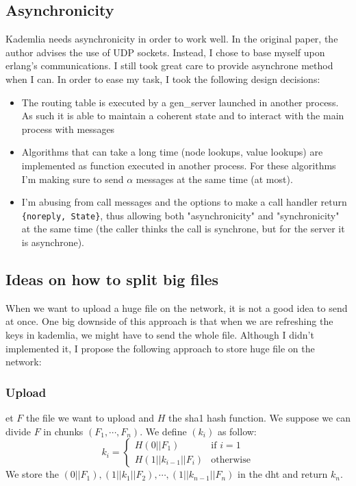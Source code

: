 \documentclass[a4paper]{article}
\begin{document}
\subsection{Asynchronicity}

Kademlia needs asynchronicity in order to work well. In the original paper, the author advises the use of UDP sockets. Instead, I chose to base myself upon erlang's communications. I still took great care to provide asynchrone method when I can. 
In order to ease my task, I took the following design decisions:
\begin{itemize}
    \item The routing table is executed by a gen\_server launched in another process. As such it is able to maintain a coherent state and to interact with the main process with messages
    \item Algorithms that can take a long time (node lookups, value lookups) are implemented as function executed in another process. For these algorithms I'm making sure to send $\alpha$ messages at the same time (at most).
    \item I'm abusing from call messages and the options to make a call handler return \verb|{noreply, State}|, thus allowing both "asynchronicity" and "synchronicity" at the same time (the caller thinks the call is synchrone, but for the server it is asynchrone).
\end{itemize}


\subsection{Ideas on how to split big files}

When we want to upload a huge file on the network, it is not a good idea to send at once. One big downside of this approach is that when we are refreshing the keys in kademlia, we might have to send the whole file. 
Although I didn't implemented it, I propose the following approach to store huge file on the network:
\subsubsection{Upload}
    et $F$ the file we want to upload and $H$ the sha1 hash function. We suppose we can divide $F$ in chunks $(F_1, \cdots, F_n)$. We define $(k_i)$ as follow:
        \[k_i =\left\{
	\begin{array}{ll}
        H(0 || F_1)  & \text{if } i = 1 \\
        H(1 || k_{i-1} || F_i) & \text{otherwise}
	\end{array}
\right.\]
        We store the $(0||F_1), (1||k_1||F_2), \cdots, (1||k_{n-1}||F_n)$ in the dht and return $k_n$.
\end{document}
